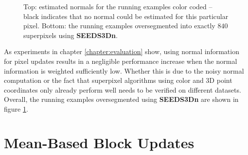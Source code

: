 \begin{figure}[t]
{	}
	\caption[Estimated normals of the running examples color coded and superpixel segmentations generated by an extension of \textbf{SEEDS} \cite{VanDenBerghBoixRoigCapitaniVanGool:2012} using normal information.]{Top: estimated normals for the running examples color coded -- black indicates that no normal could be estimated for this particular pixel. Bottom: the running examples oversegmented into exactly $840$ superpixels using \textbf{SEEDS3Dn}.}
	\label{fig:seeds-depth-3d-normal-mean-pixels-normal-computation}
\end{figure}

As experiments in chapter \ref{chapter:evaluation} show, using normal information for pixel updates results in a negligible performance increase when the normal information is weighted sufficiently low. Whether this is due to the noisy normal computation or the fact that superpixel algorithms using color and 3D point coordinates only already perform well needs to be verified on different datasets. Overall, the running examples oversegmented using \textbf{SEEDS3Dn} are shown in figure \ref{fig:seeds-depth-3d-normal-mean-pixels-normal-computation}.

\section{Mean-Based Block Updates}
\label{section:seeds-depth-mean-block-updates}

